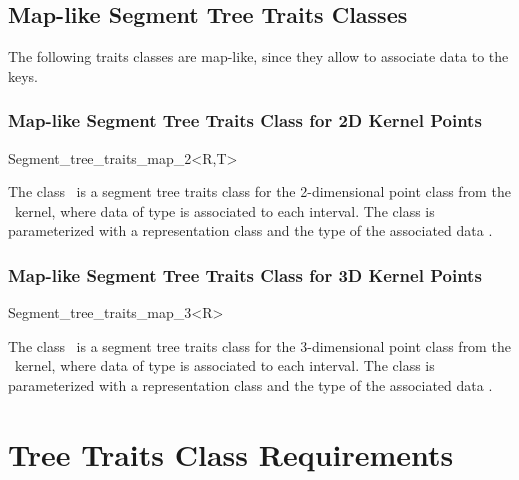 \subsection{Map-like Segment Tree Traits Classes}
The following traits classes are map-like, since they allow to
associate data to the keys.

\subsubsection{Map-like Segment Tree Traits Class for 2D Kernel Points}

\begin{ccClassTemplate} {Segment_tree_traits_map_2<R,T>}

\ccDefinition
The class \ccClassName\ is a segment tree traits class for the
2-dimensional point class from the \cgal\ kernel, where data of
type  is associated to each interval. The class is
parameterized with a representation class  and the type of
the associated data .


\ccTypes
{}


\end{ccClassTemplate} 
\subsubsection{Map-like Segment Tree Traits Class for 3D Kernel Points}

\begin{ccClassTemplate} {Segment_tree_traits_map_3<R>}

\ccDefinition
The class \ccClassName\ is a segment tree traits class for the 3-dimensional
point class from the \cgal\ kernel,  where data of
type  is associated to each interval.
The class is parameterized with a representation class  and the type of
the associated data .


\ccTypes
{}


\end{ccClassTemplate} 

\section{ Tree Traits Class Requirements \label{RT::SectReq}}

